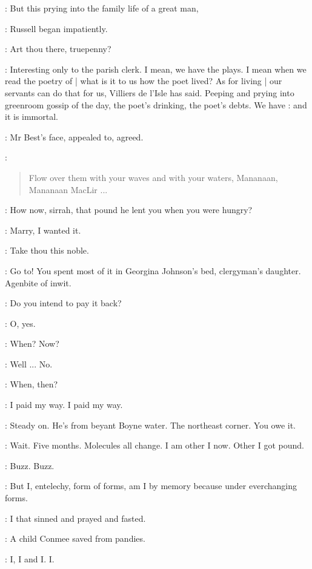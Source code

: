 \AErussell:
But this prying into the family life of a great man,

:
Russell began impatiently.

\StephenInt:
Art thou there,
truepenny?

\AErussell:
Interesting only to the parish clerk.
I mean,
we have the plays.
I mean when we read the poetry of  |
what is it to us how the poet lived?
As for living |
our servants can do that for us,
Villiers de l'Isle has said.
Peeping and prying into greenroom gossip of the day,
the poet's drinking,
the poet's debts.
We have :
and it is immortal.

:
Mr Best's face,
appealed to,
agreed.

\best:
\begin{verse}
    Flow over them with your waves and with your waters, Mananaan,
 \\
    Mananaan MacLir ...
\end{verse}

\StephenInt:
How now,
sirrah,
that pound he lent you when you were hungry?

\StephenInt:
Marry,
I wanted it.

\StephenInt:
Take thou this noble.

\StephenInt:
Go to!
You spent most of it in Georgina Johnson's bed,
clergyman's daughter.
Agenbite of inwit.

\StephenInt:
Do you intend to pay it back?

\StephenInt:
O, yes.

\StephenInt:
When?
Now?

\StephenInt:
Well ...
No.

\StephenInt:
When,
then?

\StephenInt:
I paid my way.
I paid my way.

\StephenInt:
Steady on.
He's from beyant Boyne water.
The northeast corner.
You owe it.

\StephenInt:
Wait.
Five months.
Molecules all change.
I am other I now.
Other I got pound.

\StephenInt:
Buzz.
Buzz.

\StephenInt:
But I,
entelechy,
form of forms,
am I by memory because under everchanging forms.

\StephenInt:
I that sinned and prayed and fasted.

\StephenInt:
A child Conmee saved from pandies.

\StephenInt:
I, I and I.
I.

